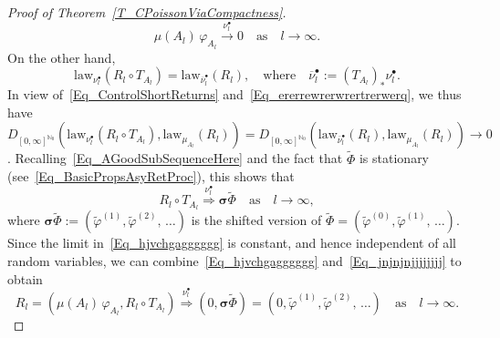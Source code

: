 \documentclass[AHL,Unicode,longabstracts]{cedram}
\newcommand{\law}{\mathrm{law}}
\newcommand{\bfsig}{\boldsymbol{\sigma}}
\newcommand{\bbN}{\mathbb{N}}
\begin{document}
\begin{proof}[Proof of Theorem~\ref{T_CPoissonViaCompactness}]
\begin{equation}
\mu(A_{l})\,\varphi_{A_{l}}\overset{\nu_{l}^{\bullet}}{\longrightarrow} 0\quad\text{as}\quad l\rightarrow\infty. 
\end{equation}
On the other hand, 
\[
\law_{\nu_{l}^{\bullet}}\left(R_{l}\circ T_{A_{l} }\right)=\law_{\overline{\nu}_{l}^{\bullet}}(R_{l}),\quad\text{where}\quad \overline{\nu }_{l}^{\bullet}:=(T_{A_{l}})_{\ast}\nu_{l}^{\bullet}.
\]
In view of~\eqref{Eq_ControlShortReturns} and~\eqref{Eq_ererrewrerwrertrerwerq}, we thus have $D_{[0,\infty]^{\bbN_{0}}}(\law_{\nu_{l}^{\bullet}} (R_{l}\circ T_{A_{l}}),\law_{\mu_{A_{l}}}(R_{l}))=D_{[0,\infty]^{\bbN_{0}}}(\law_{\overline{\nu}_{l}^{\bullet}}(R_{l}),\law_{\mu_{A_{l}}}(R_{l}))\rightarrow0$. Recalling~\eqref{Eq_AGoodSubSequenceHere} and the fact that $\widetilde{\Phi}$ is stationary (see~\eqref{Eq_BasicPropsAsyRetProc}), this shows that
\begin{equation}\label{Eq_jnjnjnjjjjjjjj}
R_{l}\circ T_{A_{l}}\overset{\nu_{l}^{\bullet}}{\Longrightarrow}
\bfsig\widetilde{\Phi} \quad \text{as}\quad l\rightarrow\infty,
\end{equation}
where $\bfsig\widetilde{\Phi}:=(\widetilde{\varphi}^{(1)},\widetilde{\varphi}^{(2)},\,\ldots)$ is the shifted version of $\widetilde {\Phi}=(\widetilde{\varphi}^{(0)},\widetilde{\varphi}^{(1)},\,\ldots)$. Since the limit in~\eqref{Eq_hjvchgagggggg} is constant, and hence independent of all random variables, we can combine~\eqref{Eq_hjvchgagggggg} and~\eqref{Eq_jnjnjnjjjjjjjj} to obtain
\begin{equation} \label{Eqwassssssaballl}
R_{l}=\left(\mu(A_{l})\,\varphi_{A_{l}},R_{l}\circ T_{A_{l}}\right)\overset{\nu _{l}^{\bullet}}{\Longrightarrow}\left(0,\bfsig\widetilde{\Phi }\right)=\left(0,\widetilde{\varphi}^{(1)},\widetilde{\varphi}^{(2)},\,\ldots\right) \quad\text{as}\quad l\rightarrow\infty.
\end{equation}


\end{proof}
\end{document}

